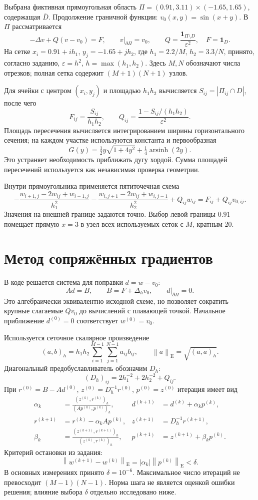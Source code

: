 \documentclass[11pt,a4paper]{article}
\newcommand{\norm}[1]{\left\lVert #1\right\rVert}
\newcommand{\E}{\mathrm{E}}
\begin{document}
Выбрана фиктивная прямоугольная область
$\Pi=(0.91,3.11)\times(-1.65,1.65)$, содержащая $\overline D$.
Продолжение граничной функции: $v_0(x,y)=\sin(x+y)$. В $\Pi$ рассматривается
\[
-\Delta v+Q(v-v_0)=F,\qquad v|_{\partial\Pi}=v_0,
\qquad Q=\frac{\boldsymbol1_{\Pi\setminus D}}{\varepsilon^2},\quad
F=\boldsymbol1_D.
\]
На сетке $x_i=0.91+ih_1$, $y_j=-1.65+jh_2$, где
$h_1=2.2/M$, $h_2=3.3/N$, принято, согласно заданию,
$\varepsilon=h^2$, $h=\max(h_1,h_2)$. Здесь $M,N$ обозначают числа
отрезков; полная сетка содержит $(M+1)(N+1)$ узлов.

Для ячейки с центром $(x_i,y_j)$ и площадью $h_1h_2$ вычисляется
$S_{ij}=|\Pi_{ij}\cap D|$, после чего
\[
F_{ij}=\frac{S_{ij}}{h_1h_2},\qquad
Q_{ij}=\frac{1-S_{ij}/(h_1h_2)}{\varepsilon^2}.
\]
Площадь пересечения вычисляется интегрированием ширины горизонтального
сечения; на каждом участке используются константа и первообразная
\[
G(y)=\tfrac12 y\sqrt{1+4y^2}+\tfrac14\operatorname{arsinh}(2y).
\]
Это устраняет необходимость приближать дугу хордой. Сумма площадей
пересечений используется как независимая проверка геометрии.

Внутри прямоугольника применяется пятиточечная схема
\[
-\frac{w_{i+1,j}-2w_{ij}+w_{i-1,j}}{h_1^2}
-\frac{w_{i,j+1}-2w_{ij}+w_{i,j-1}}{h_2^2}
+Q_{ij}w_{ij}=F_{ij}+Q_{ij}v_{0,ij}.
\]
Значения на внешней границе задаются точно. Выбор левой границы $0.91$
помещает прямую $x=3$ в узел всех используемых сеток с $M$, кратным 20.

\clearpage
\section{Метод сопряжённых градиентов}
В коде решается система для поправки $d=w-v_0$:
\[
A d=B,\qquad B=F+\Delta_hv_0,\qquad d|_{\partial\Pi}=0.
\]
Это алгебраически эквивалентно исходной схеме, но позволяет сократить
крупные слагаемые $Qv_0$ до вычислений с плавающей точкой. Начальное
приближение $d^{(0)}=0$ соответствует $w^{(0)}=v_0$.

Используется сеточное скалярное произведение
\[
(a,b)_h=h_1h_2\sum_{i=1}^{M-1}\sum_{j=1}^{N-1}a_{ij}b_{ij},
\qquad \norm a_\E=\sqrt{(a,a)_h}.
\]
Диагональный предобуславливатель обозначим $D_h$:
\[
(D_h)_{ij}=2h_1^{-2}+2h_2^{-2}+Q_{ij}.
\]
При $r^{(0)}=B-Ad^{(0)}$, $z^{(0)}=D_h^{-1}r^{(0)}$, $p^{(0)}=z^{(0)}$
итерация имеет вид
\begin{align*}
\alpha_k&=\frac{(z^{(k)},r^{(k)})_h}{(Ap^{(k)},p^{(k)})_h}, &
d^{(k+1)}&=d^{(k)}+\alpha_kp^{(k)},\\
r^{(k+1)}&=r^{(k)}-\alpha_kAp^{(k)}, &
z^{(k+1)}&=D_h^{-1}r^{(k+1)},\\
\beta_k&=\frac{(z^{(k+1)},r^{(k+1)})_h}{(z^{(k)},r^{(k)})_h}, &
p^{(k+1)}&=z^{(k+1)}+\beta_kp^{(k)}.
\end{align*}
Критерий остановки из задания:
\[
\norm{w^{(k+1)}-w^{(k)}}_\E
=|\alpha_k|\norm{p^{(k)}}_\E<\delta.
\]
В основных измерениях принято $\delta=10^{-6}$. Максимальное число
итераций не превосходит $(M-1)(N-1)$. Норма шага не является оценкой
ошибки решения; влияние выбора $\delta$ отдельно исследовано ниже.
\end{document}
